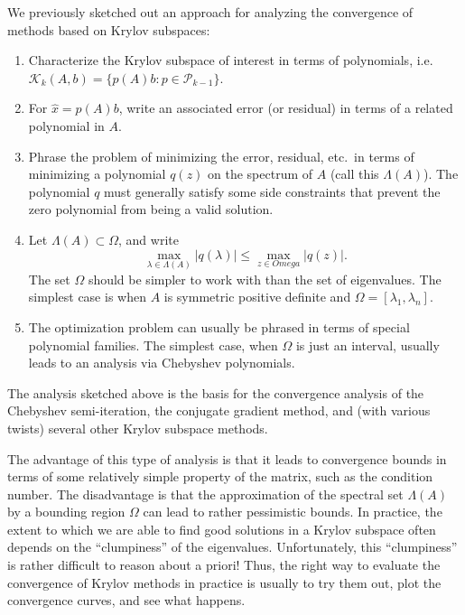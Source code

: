 \documentclass[12pt, leqno]{article} %
\begin{document}
We previously sketched out an approach for analyzing the convergence of
methods based on Krylov subspaces:
\begin{enumerate}
\item
  Characterize the Krylov subspace of interest in terms of polynomials,
  i.e. $\mathcal{K}_k(A,b) = \{ p(A)b : p \in \mathcal{P}_{k-1} \}$.
\item
  For $\hat{x} = p(A) b$, write an associated error (or residual)
  in terms of a related polynomial in $A$.
\item
  Phrase the problem of minimizing the error, residual, etc.~in terms
  of minimizing a polynomial $q(z)$ on the spectrum of $A$
  (call this $\Lambda(A)$).  The polynomial $q$ must generally satisfy
  some side constraints that prevent the zero polynomial from being
  a valid solution.
\item
  Let $\Lambda(A) \subset \Omega$, and write
  \[
    \max_{\lambda \in \Lambda(A)} |q(\lambda)| \leq
    \max_{z \in Omega} |q(z)|.
  \]
  The set $\Omega$ should be simpler to work with than the set of
  eigenvalues.  The simplest case is when $A$ is symmetric positive
  definite and $\Omega = [\lambda_1, \lambda_n]$.
\item
  The optimization problem can usually be phrased in terms of special
  polynomial families.  The simplest case, when $\Omega$ is just an
  interval, usually leads to an analysis via Chebyshev polynomials.
\end{enumerate}
The analysis sketched above is the basis for the convergence analysis
of the Chebyshev semi-iteration, the conjugate gradient method, and
(with various twists) several other Krylov subspace methods.

The advantage of this type of analysis is that it leads to convergence
bounds in terms of some relatively simple property of the matrix, such
as the condition number.  The disadvantage is that the approximation of
the spectral set $\Lambda(A)$ by a bounding region $\Omega$ can lead to
rather pessimistic bounds.  In practice, the extent to which we are able
to find good solutions in a Krylov subspace often depends on the
``clumpiness'' of the eigenvalues.  Unfortunately, this ``clumpiness''
is rather difficult to reason about a priori!  Thus, the right way to evaluate
the convergence of Krylov methods in practice is usually to try them out,
plot the convergence curves, and see what happens.
\end{document}
